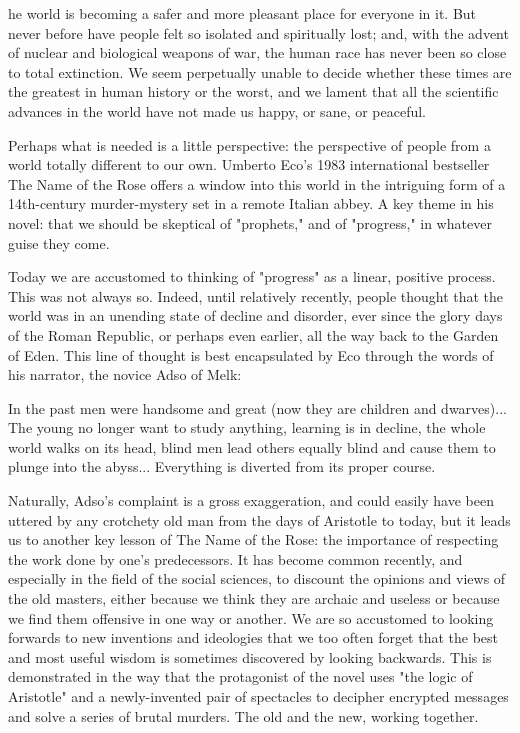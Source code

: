 \label{ch:the-name-of-the-rose}

   he world is becoming a safer and more pleasant place for everyone in
   it. But never before have people felt so isolated and spiritually lost;
   and, with the advent of nuclear and biological weapons of war, the
   human race has never been so close to total extinction. We seem
   perpetually unable to decide whether these times are the greatest in
   human history or the worst, and we lament that all the scientific
   advances in the world have not made us happy, or sane, or peaceful.

   Perhaps what is needed is a little perspective: the perspective of
   people from a world totally different to our own. Umberto Eco's 1983
   international bestseller The Name of the Rose offers a window into this
   world in the intriguing form of a 14th-century murder-mystery set in a
   remote Italian abbey. A key theme in his novel: that we should be
   skeptical of "prophets," and of "progress," in whatever guise they
   come.

   Today we are accustomed to thinking of "progress" as a linear, positive
   process. This was not always so. Indeed, until relatively recently,
   people thought that the world was in an unending state of decline and
   disorder, ever since the glory days of the Roman Republic, or perhaps
   even earlier, all the way back to the Garden of Eden. This line of
   thought is best encapsulated by Eco through the words of his narrator,
   the novice Adso of Melk:

     In the past men were handsome and great (now they are children and
     dwarves)... The young no longer want to study anything, learning is
     in decline, the whole world walks on its head, blind men lead others
     equally blind and cause them to plunge into the abyss... Everything
     is diverted from its proper course.

   Naturally, Adso's complaint is a gross exaggeration, and could easily
   have been uttered by any crotchety old man from the days of Aristotle
   to today, but it leads us to another key lesson of The Name of the
   Rose: the importance of respecting the work done by one's predecessors.
   It has become common recently, and especially in the field of the
   social sciences, to discount the opinions and views of the old masters,
   either because we think they are archaic and useless or because we find
   them offensive in one way or another. We are so accustomed to
   looking forwards to new inventions and ideologies that we too often
   forget that the best and most useful wisdom is sometimes discovered by
   looking backwards. This is demonstrated in the way that the protagonist
   of the novel uses "the logic of Aristotle" and a newly-invented pair of
   spectacles to decipher encrypted messages and solve a series of brutal
   murders. The old and the new, working together.

